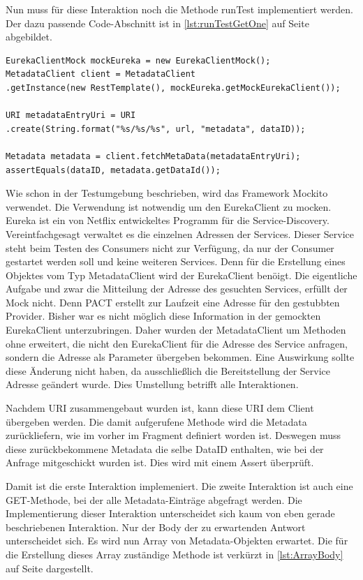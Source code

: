 \documentclass{llncs}
\begin{document}
Nun muss für diese Interaktion noch die Methode runTest implementiert werden. Der dazu passende Code-Abschnitt ist in \ref{lst:runTestGetOne} auf Seite \pageref{lst:runTestGetOne} abgebildet.

\lstset{language = Java}
\begin{lstlisting}[caption=Test,label={lst:runTestGetOne}]
EurekaClientMock mockEureka = new EurekaClientMock();
MetadataClient client = MetadataClient
.getInstance(new RestTemplate(), mockEureka.getMockEurekaClient());

URI metadataEntryUri = URI
.create(String.format("%s/%s/%s", url, "metadata", dataID));

Metadata metadata = client.fetchMetaData(metadataEntryUri);
assertEquals(dataID, metadata.getDataId());
\end{lstlisting}
 
Wie schon in der Testumgebung beschrieben, wird das Framework Mockito verwendet. Die Verwendung ist notwendig um den EurekaClient zu mocken. Eureka \cite{Ranganathan2012} ist ein von Netflix entwickeltes Programm für die Service-Discovery. Vereintfachgesagt verwaltet es die einzelnen Adressen der Services. Dieser Service steht beim Testen des Consumers nicht zur Verfügung, da nur der Consumer gestartet werden soll und keine weiteren Services. Denn für die Erstellung eines Objektes vom Typ MetadataClient wird der EurekaClient benöigt. Die eigentliche Aufgabe und zwar die Mitteilung der Adresse des gesuchten Services, erfüllt der Mock nicht. Denn PACT erstellt zur Laufzeit eine Adresse für den gestubbten Provider. Bisher war es nicht möglich diese Information in der gemockten EurekaClient unterzubringen. Daher wurden der MetadataClient um Methoden ohne erweitert, die nicht den EurekaClient für die Adresse des Service anfragen, sondern die Adresse als Parameter übergeben bekommen. Eine Auswirkung sollte diese Änderung nicht haben, da ausschließlich die Bereitstellung der Service Adresse geändert wurde. Dies Umstellung betrifft alle Interaktionen.

Nachdem URI zusammengebaut wurden ist, kann diese URI dem Client übergeben werden. Die damit aufgerufene Methode wird die Metadata zurückliefern, wie im vorher im Fragment definiert worden ist. Deswegen muss diese zurückbekommene Metadata die selbe DataID enthalten, wie bei der Anfrage mitgeschickt wurden ist. Dies wird mit einem Assert überprüft.

Damit ist die erste Interaktion implemeniert. Die zweite Interaktion ist auch eine GET-Methode, bei der alle Metadata-Einträge abgefragt werden. Die Implementierung dieser Interaktion unterscheidet sich kaum von eben gerade beschriebenen Interaktion. Nur der Body der zu erwartenden Antwort unterscheidet sich. Es wird nun Array von Metadata-Objekten erwartet. Die für die Erstellung dieses Array zuständige Methode ist verkürzt in \ref{lst:ArrayBody} auf Seite \pageref{lst:ArrayBody} dargestellt.
\end{document}
